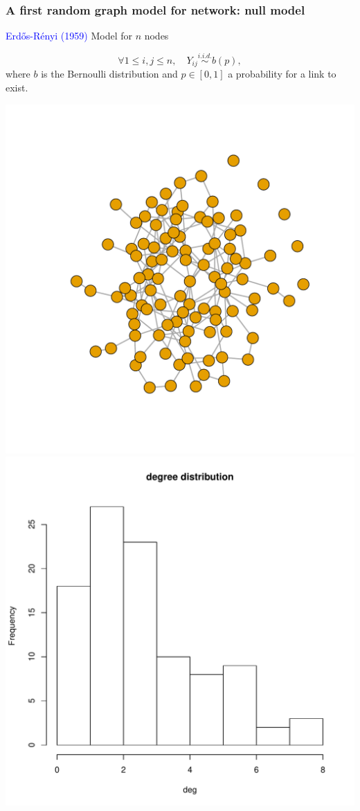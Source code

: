 \documentclass[compress,10pt]{beamer}
\begin{document}
\begin{frame}
\frametitle{A first random graph model for network: null model}

\textcolor{blue}{Erd\H{o}s-Rényi (1959)} Model for $n$ nodes 

$$\forall 1\le i,j\le n,\quad Y_{ij}\overset{i.i.d.}{\sim} b(p),$$
where $b$ is the Bernoulli distribution and $p\in[0,1]$ a probability for a link to exist. 


\begin{center}
 \includegraphics[scale=.3]{plots/ER.pdf} \includegraphics[scale=.3]{plots/degER.pdf}
\end{center}


\end{frame}
\end{document}
